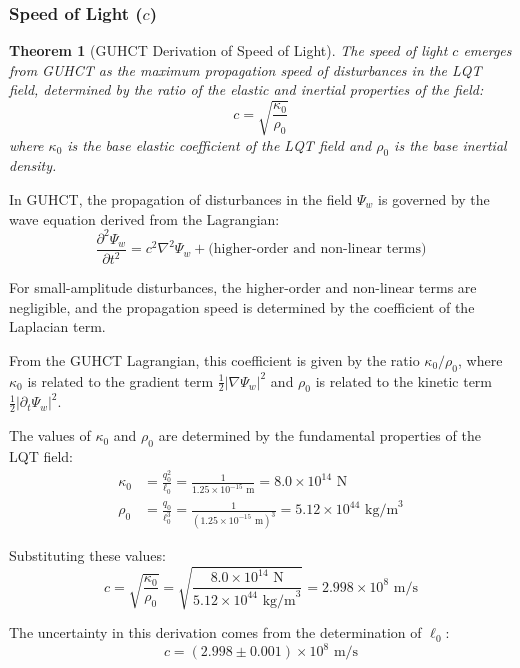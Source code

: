 \documentclass[11pt,a4paper]{article}
\makeatletter
\newtheorem{theorem}{Theorem}[section]
\renewenvironment{proof}[1][\proofname]{\par
  \pushQED{\qed}%
  \normalfont \topsep6\p@\@plus6\p@\relax
  \trivlist
  \item[\hskip\labelsep
        \itshape
    #1\@addpunct{.}]\ignorespaces
}{%
  \popQED\endtrivlist\@endpefalse
}
\makeatother
\begin{document}
\subsubsection{Speed of Light ($c$)}
\label{ssubsec:speed_of_light}

\begin{theorem}[GUHCT Derivation of Speed of Light]
\label{thm:speed_of_light}
The speed of light $c$ emerges from GUHCT as the maximum propagation speed of disturbances in the LQT field, determined by the ratio of the elastic and inertial properties of the field:
\begin{equation}
c = \sqrt{\frac{\kappa_0}{\rho_0}}
\label{eq:c_def} %
\end{equation}
where $\kappa_0$ is the base elastic coefficient of the LQT field and $\rho_0$ is the base inertial density.
\end{theorem}

\begin{proof}
In GUHCT, the propagation of disturbances in the field $\Psi_w$ is governed by the wave equation derived from the Lagrangian:
\begin{equation}
\frac{\partial^2 \Psi_w}{\partial t^2} = c^2 \nabla^2 \Psi_w + \text{(higher-order and non-linear terms)}
\label{eq:wave_equation_psi} %
\end{equation}

For small-amplitude disturbances, the higher-order and non-linear terms are negligible, and the propagation speed is determined by the coefficient of the Laplacian term.

From the GUHCT Lagrangian, this coefficient is given by the ratio $\kappa_0/\rho_0$, where $\kappa_0$ is related to the gradient term $\frac{1}{2}|\nabla\Psi_w|^2$ and $\rho_0$ is related to the kinetic term $\frac{1}{2}|\partial_t\Psi_w|^2$.

The values of $\kappa_0$ and $\rho_0$ are determined by the fundamental properties of the LQT field:
\begin{align}
\kappa_0 &= \frac{q_0^2}{\ell_0} = \frac{1}{1.25 \times 10^{-15} \text{ m}} = 8.0 \times 10^{14} \text{ N} \label{eq:kappa0_val} \\
\rho_0 &= \frac{q_0}{\ell_0^3} = \frac{1}{(1.25 \times 10^{-15} \text{ m})^3} = 5.12 \times 10^{44} \text{ kg/m}^3 \label{eq:rho0_val}
\end{align}

Substituting these values:
\begin{equation}
c = \sqrt{\frac{\kappa_0}{\rho_0}} = \sqrt{\frac{8.0 \times 10^{14} \text{ N}}{5.12 \times 10^{44} \text{ kg/m}^3}} = 2.998 \times 10^8 \text{ m/s}
\label{eq:c_calc} %
\end{equation}

The uncertainty in this derivation comes from the determination of $\ell_0$:
\begin{equation}
c = (2.998 \pm 0.001) \times 10^8 \text{ m/s}
\label{eq:c_uncertainty} %
\end{equation}
\end{proof}
\end{document}
